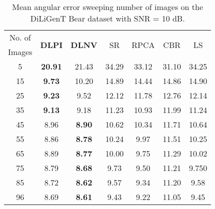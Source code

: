 \begin{table}[ht!]
\centering
\begin{tabular}{|c|c|c|c|c|c|c|}
\cline{1-7}
No. of & \multirow{2}{*}{\bf{DLPI}} & \multirow{2}{*}{\bf{DLNV}} & \multirow{2}{*}{SR} & \multirow{2}{*}{RPCA} & \multirow{2}{*}{CBR} & \multirow{2}{*}{LS} \\ %
Images & & & & & & \\
\cline{1-7}
5 & \textbf{20.91} & 21.43 & 34.29 & 33.12 & 31.10 & 34.25  \\
\cline{1-7}
15 & \textbf{9.73} & 10.20 & 14.89 & 14.44 & 14.86 & 14.90 \\
\cline{1-7}
25 & \textbf{9.23} & 9.52 & 12.12 & 11.78 & 12.76 & 12.14 \\
\cline{1-7}
35 & \textbf{9.13} & 9.18 & 11.23 & 10.93 & 11.99 & 11.24  \\
\cline{1-7}
45 & 8.96 & \textbf{8.90} & 10.62 & 10.34 & 11.71 & 10.64  \\
\cline{1-7}
55 & 8.86 & \textbf{8.78} & 10.24 & 9.97 & 11.51 & 10.25  \\
\cline{1-7}
65 & 8.89 & \textbf{8.77} & 10.00 & 9.75 & 11.29 & 10.02  \\
\cline{1-7}
75 & 8.79 & \textbf{8.68} & 9.73 & 9.50 & 11.21 & 9.750 \\
\cline{1-7}
85 & 8.72 & \textbf{8.62} & 9.57 & 9.34 & 11.20 & 9.58  \\
\cline{1-7}
96 & 8.69 & \textbf{8.61} & 9.43 & 9.22 & 11.05 & 9.45 \\
\cline{1-7}
\end{tabular}
\caption{Mean angular error sweeping number of images on the DiLiGenT Bear dataset \cite{shi2016} with SNR = 10 dB.}
\label{tab:sweep_nim_na_10_0_Dbears_all}
\vspace{-4mm}
\end{table}



